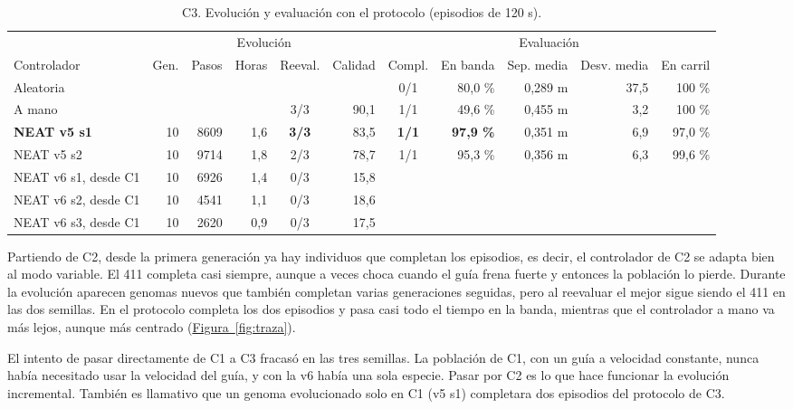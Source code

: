 \documentclass[11pt,a4paper]{article}
\newcommand{\grados}{\textdegree}
\newcommand{\figref}[1]{\hyperref[#1]{Figura~\ref*{#1}}}
\begin{document}
\begin{table}[h]
\centering\small
\caption{C3. Evolución y evaluación con el protocolo (episodios de 120 s).}
\label{tab:c3}
\begin{adjustbox}{max width=\textwidth}
\begin{tabular}{@{}lrrrcrcrrrr@{}}
\toprule
& \multicolumn{5}{c}{Evolución} & \multicolumn{5}{c}{Evaluación} \\
\cmidrule(lr){2-6}\cmidrule(l){7-11}
Controlador & Gen. & Pasos & Horas & Reeval. & Calidad & Compl. & En banda & Sep. media & Desv. media & En carril \\
\midrule
Aleatoria & & & & & & 0/1 & 80,0 \% & 0,289 m & 37,5\grados & 100 \% \\
A mano & & & & 3/3 & 90,1 & 1/1 & 49,6 \% & 0,455 m & 3,2\grados & 100 \% \\
\textbf{NEAT v5 s1} & 10 & 8609 & 1,6 & \textbf{3/3} & 83,5 & \textbf{1/1} & \textbf{97,9 \%} & 0,351 m & 6,9\grados & 97,0 \% \\
NEAT v5 s2 & 10 & 9714 & 1,8 & 2/3 & 78,7 & 1/1 & 95,3 \% & 0,356 m & 6,3\grados & 99,6 \% \\
NEAT v6 s1, desde C1 & 10 & 6926 & 1,4 & 0/3 & 15,8 & & & & & \\
NEAT v6 s2, desde C1 & 10 & 4541 & 1,1 & 0/3 & 18,6 & & & & & \\
NEAT v6 s3, desde C1 & 10 & 2620 & 0,9 & 0/3 & 17,5 & & & & & \\
\bottomrule
\end{tabular}
\end{adjustbox}
\end{table}

Partiendo de C2, desde la primera generación ya hay individuos que completan los episodios, es decir, el
controlador de C2 se adapta bien al modo variable. El 411 completa casi siempre, aunque a veces choca cuando el
guía frena fuerte y entonces la población lo pierde. Durante la evolución aparecen genomas nuevos que también
completan varias generaciones seguidas, pero al reevaluar el mejor sigue siendo el 411 en las dos semillas. En
el protocolo completa los dos episodios y pasa casi todo el tiempo en la banda, mientras que el controlador a
mano va más lejos, aunque más centrado (\figref{fig:traza}).

El intento de pasar directamente de C1 a C3 fracasó en las tres semillas. La población de C1, con un guía a
velocidad constante, nunca había necesitado usar la velocidad del guía, y con la v6 había una sola especie.
Pasar por C2 es lo que hace funcionar la evolución incremental. También es llamativo que un genoma evolucionado
solo en C1 (v5 s1) completara dos episodios del protocolo de C3.
\end{document}
